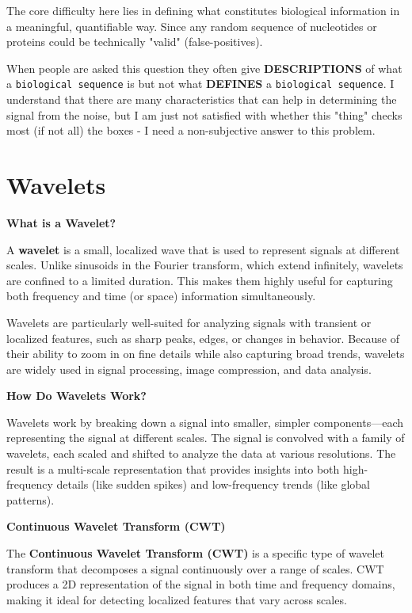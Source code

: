 \documentclass[11pt]{report}
\begin{document}
{\begin{tcolorbox}[colback=gray!10!white, coltitle=white, colframe=gray!80!black, title=Biological Information]
	The core difficulty here lies in defining what constitutes biological information in a meaningful, quantifiable way. Since any random sequence of nucleotides or proteins could be technically "valid" (false-positives). 
	
	When people are asked this question they often give \textbf{DESCRIPTIONS} of what a \texttt{biological sequence} is but not what \textbf{DEFINES} a \texttt{biological sequence}. I understand that there are many characteristics that can help in determining the signal from the noise, but I am just not satisfied with whether this "thing" checks most (if not all) the boxes - I need a non-subjective answer to this problem. 
\end{tcolorbox}

\section{Wavelets}
\begin{tcolorbox}[label=box:Wavelets, colback=gray!10!white, coltitle=white, colframe=gray!80!black, title= Wavelets, breakable]
	\textbf{What is a Wavelet?} 
	
	A \textbf{wavelet} is a small, localized wave that is used to represent signals at different scales. Unlike sinusoids in the Fourier transform, which extend infinitely, wavelets are confined to a limited duration. This makes them highly useful for capturing both frequency and time (or space) information simultaneously.
	
	Wavelets are particularly well-suited for analyzing signals with transient or localized features, such as sharp peaks, edges, or changes in behavior. Because of their ability to zoom in on fine details while also capturing broad trends, wavelets are widely used in signal processing, image compression, and data analysis.
	
	\textbf{How Do Wavelets Work?}
	
	Wavelets work by breaking down a signal into smaller, simpler components—each representing the signal at different scales. The signal is convolved with a family of wavelets, each scaled and shifted to analyze the data at various resolutions. The result is a multi-scale representation that provides insights into both high-frequency details (like sudden spikes) and low-frequency trends (like global patterns).
	
	\textbf{Continuous Wavelet Transform (CWT)}
	
	The \textbf{Continuous Wavelet Transform (CWT)} is a specific type of wavelet transform that decomposes a signal continuously over a range of scales. CWT produces a 2D representation of the signal in both time and frequency domains, making it ideal for detecting localized features that vary across scales.
	

\end{tcolorbox}}
\end{document}
